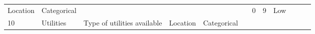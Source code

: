 \documentclass[11pt]{article}
\begin{document}
\begin{longtable}[]{@{}llllllllllll@{}}
\begin{minipage}[t]{0.04\columnwidth}
Location\strut
\end{minipage} & \begin{minipage}[t]{0.04\columnwidth}\raggedright\strut
Categorical\strut
\end{minipage} & \begin{minipage}[t]{0.04\columnwidth}\raggedright\strut
\strut
\end{minipage} & \begin{minipage}[t]{0.04\columnwidth}\raggedright\strut
\strut
\end{minipage} & \begin{minipage}[t]{0.04\columnwidth}\raggedright\strut
\strut
\end{minipage} & \begin{minipage}[t]{0.04\columnwidth}\raggedright\strut
\strut
\end{minipage} & \begin{minipage}[t]{0.04\columnwidth}\raggedright\strut
0\strut
\end{minipage} & \begin{minipage}[t]{0.04\columnwidth}\raggedright\strut
9\strut
\end{minipage} & \begin{minipage}[t]{0.04\columnwidth}\raggedright\strut
Low\strut
\end{minipage}\tabularnewline
\begin{minipage}[t]{0.04\columnwidth}\raggedright\strut
10\strut
\end{minipage} & \begin{minipage}[t]{0.04\columnwidth}\raggedright\strut
Utilities\strut
\end{minipage} & \begin{minipage}[t]{0.04\columnwidth}\raggedright\strut
Type of utilities available\strut
\end{minipage} & \begin{minipage}[t]{0.04\columnwidth}\raggedright\strut
Location\strut
\end{minipage} & \begin{minipage}[t]{0.04\columnwidth}\raggedright\strut
Categorical\strut
\end{minipage} & \begin{minipage}[t]{0.04\columnwidth}\raggedright\strut
\strut
\end{minipage} & \begin{minipage}[t]{0.04\columnwidth}\raggedright\strut
\strut
\end{minipage} & \begin{minipage}[t]{0.04\columnwidth}\raggedright\strut

\end{minipage}
\end{longtable}
\end{document}
